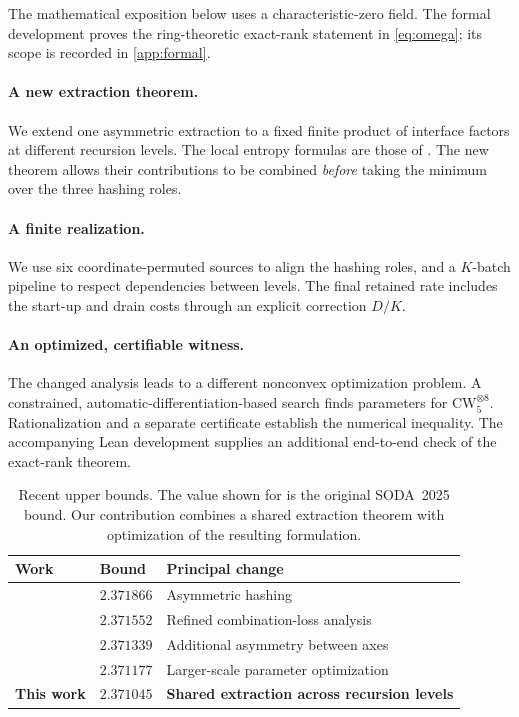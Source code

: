 \documentclass[11pt,a4paper]{article}
\newcommand{\CW}{\mathrm{CW}}
\begin{document}
The mathematical exposition below uses a characteristic-zero field. The formal development proves the ring-theoretic exact-rank statement in \cref{eq:omega}; its scope is recorded in \cref{app:formal}.

\paragraph{A new extraction theorem.}
We extend one asymmetric extraction to a fixed finite product of interface factors at different recursion levels. The local entropy formulas are those of \citet{alman2025}. The new theorem allows their contributions to be combined \emph{before} taking the minimum over the three hashing roles.

\paragraph{A finite realization.}
We use six coordinate-permuted sources to align the hashing roles, and a $K$-batch pipeline to respect dependencies between levels. The final retained rate includes the start-up and drain costs through an explicit correction $D/K$.

\paragraph{An optimized, certifiable witness.}
The changed analysis leads to a different nonconvex optimization problem. A constrained, automatic-differentiation-based search finds parameters for $\CW_5^{\otimes8}$. Rationalization and a separate certificate establish the numerical inequality. The accompanying Lean development supplies an additional end-to-end check of the exact-rank theorem.

\begin{table}[t]
\centering\small
\begin{tabularx}{\linewidth}{@{}l l X@{}}
\toprule
Work & Bound & Principal change\\
\midrule
\citet{dwz2023} & $2.371866$ & Asymmetric hashing\\
\citet{vxxz2024} & $2.371552$ & Refined combination-loss analysis\\
\citet{alman2025} & $2.371339$ & Additional asymmetry between axes\\
\citet{dupont2026} & $2.371177$ & Larger-scale parameter optimization\\
\textbf{This work} & $\mathbf{2.371045}$ & \textbf{Shared extraction across recursion levels}\\
\bottomrule
\end{tabularx}
\caption{Recent upper bounds. The value shown for \citet{alman2025} is the original SODA~2025 bound. Our contribution combines a shared extraction theorem with optimization of the resulting formulation.}
\label{tab:history}
\end{table}
\end{document}
